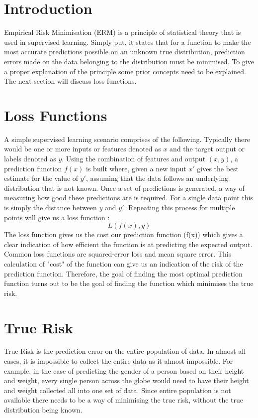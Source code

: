 \documentclass{article}
\begin{document}
\section{Introduction}
Empirical Risk Minimisation (ERM) is a principle of statistical theory that is used in supervised learning. Simply put, it states that for a function to make the most accurate predictions possible on an unknown true distribution, prediction errors made on the data belonging to the distribution must be minimised. To give a proper explanation of the principle some prior concepts need to be explained. The next section will discuss loss functions. 

\section{Loss Functions}
A simple supervised learning scenario comprises of the following. Typically there would be one or more inputs or features denoted as $x$ and the target output or labels denoted as $y$.
Using the combination of features and output $(x,y)$, a prediction function $f(x)$ is built where, given a new input $x'$ gives the best estimate for the value of $y'$, assuming that the data follows an underlying distribution that is not known. Once a set of predictions is generated, a way of measuring how good these predictions are is required. For a single data point this is simply the distance between $y$ and $y'$. Repeating this process for multiple points will give us a loss function \citep{Wehenkel2018}:
\begin{equation}
    L(f(x),y)
\end{equation}
The loss function gives us the cost our prediction function (f(x)) which gives a clear indication of how efficient the function is at predicting the expected output. Common loss functions are squared-error loss  and mean square error. This calculation of "cost" of the function can give us an indication of the risk of the prediction function. Therefore, the goal of finding the most optimal prediction function turns out to be the goal of finding the function which minimises the true risk.

\section{True Risk}

True Risk is the prediction error on the entire population of data. In almost all cases, it is impossible to collect the entire data as it almost impossible. For example, in the case of predicting the gender of a person based on their height and weight, every single person across the globe would need to have their height and weight collected all into one set of data. Since entire population is not available there needs to be a way of minimising the true risk, without the true distribution being known. 
\end{document}
